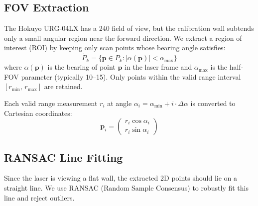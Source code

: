 \documentclass[12pt,a4paper]{article}
\newcommand{\pvec}{\mathbf{p}}
\begin{document}
\subsection{FOV Extraction}
\label{sec:fov}

The Hokuyo URG-04LX has a 240\textdegree{} field of view, but the
calibration wall subtends only a small angular region near the forward
direction. We extract a region of interest (ROI) by keeping only
scan points whose bearing angle satisfies:
\begin{equation}
    \tilde{P}_k = \bigl\{ \pvec \in P_k : |\alpha(\pvec)| < \alpha_{\max} \bigr\}
    \label{eq:fov_extraction}
\end{equation}
where $\alpha(\pvec)$ is the bearing of point $\pvec$ in the laser frame
and $\alpha_{\max}$ is the half-FOV parameter (typically 10--15\textdegree).
Only points within the valid range interval $[r_{\min},\, r_{\max}]$ are retained.

Each valid range measurement $r_i$ at angle $\alpha_i = \alpha_{\min} + i \cdot \Delta\alpha$
is converted to Cartesian coordinates:
\begin{equation}
    \pvec_i = \begin{pmatrix} r_i \cos\alpha_i \\ r_i \sin\alpha_i \end{pmatrix}
    \label{eq:polar_to_cart}
\end{equation}

\subsection{RANSAC Line Fitting}
\label{sec:ransac}

Since the laser is viewing a flat wall, the extracted 2D points should
lie on a straight line. We use RANSAC (Random Sample Consensus) to
robustly fit this line and reject outliers.
\end{document}

